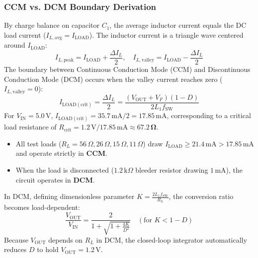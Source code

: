 \documentclass[11pt,a4paper]{article}
\begin{document}
\subsubsection{CCM vs. DCM Boundary Derivation}
By charge balance on capacitor $C_1$, the average inductor current equals the DC load current ($I_{L,\mathrm{avg}} = I_{\mathrm{LOAD}}$). The inductor current is a triangle wave centered around $I_{\mathrm{LOAD}}$:
\begin{equation}
    I_{L,\mathrm{peak}} = I_{\mathrm{LOAD}} + \frac{\Delta I_L}{2}, \quad I_{L,\mathrm{valley}} = I_{\mathrm{LOAD}} - \frac{\Delta I_L}{2}
\end{equation}
The boundary between Continuous Conduction Mode (CCM) and Discontinuous Conduction Mode (DCM) occurs when the valley current reaches zero ($I_{L,\mathrm{valley}} = 0$):
\begin{equation}
    I_{\mathrm{LOAD(crit)}} = \frac{\Delta I_L}{2} = \frac{(V_{\mathrm{OUT}} + V_F)(1 - D)}{2 L_1 f_{\mathrm{SW}}}
\end{equation}
For $V_{\mathrm{IN}} = 5.0\,\mathrm{V}$, $I_{\mathrm{LOAD(crit)}} = 35.7\,\mathrm{mA} / 2 = \mathbf{17.85\,\mathrm{mA}}$, corresponding to a critical load resistance of $R_{\mathrm{crit}} = 1.2\,\mathrm{V} / 17.85\,\mathrm{mA} \approx \mathbf{67.2\,\Omega}$.
\begin{itemize}
    \item All test loads ($R_L = 56\,\Omega, 26\,\Omega, 15\,\Omega, 11\,\Omega$) draw $I_{\mathrm{LOAD}} \ge 21.4\,\mathrm{mA} > 17.85\,\mathrm{mA}$ and operate strictly in \textbf{CCM}.
    \item When the load is disconnected ($1.2\,\mathrm{k}\Omega$ bleeder resistor drawing $1\,\mathrm{mA}$), the circuit operates in \textbf{DCM}.
\end{itemize}

In DCM, defining dimensionless parameter $K = \frac{2 L_1 f_{\mathrm{SW}}}{R_L}$, the conversion ratio becomes load-dependent:
\begin{equation}
    \frac{V_{\mathrm{OUT}}}{V_{\mathrm{IN}}} = \frac{2}{1 + \sqrt{1 + \frac{4K}{D^2}}} \quad (\text{for } K < 1 - D)
\end{equation}
Because $V_{\mathrm{OUT}}$ depends on $R_L$ in DCM, the closed-loop integrator automatically reduces $D$ to hold $V_{\mathrm{OUT}} = 1.2\,\mathrm{V}$.
\end{document}
